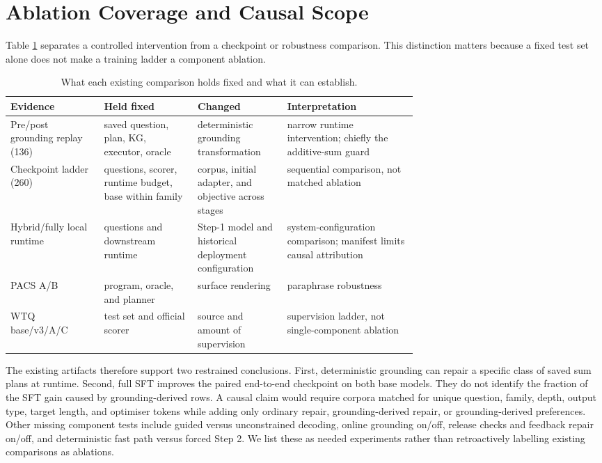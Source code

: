 \section{Ablation Coverage and Causal Scope}
\label{app:ablations}

Table \ref{tab:ablation-scope} separates a controlled intervention from a checkpoint or robustness
comparison.  This distinction matters because a fixed test set alone does not make a training
ladder a component ablation.

\begin{table}[h]
  \centering
  \caption{What each existing comparison holds fixed and what it can establish.}
  \label{tab:ablation-scope}
  \small
  \begin{tabularx}{\linewidth}{p{0.23\linewidth}p{0.23\linewidth}p{0.22\linewidth}X}
    \toprule
    Evidence & Held fixed & Changed & Interpretation \\
    \midrule
    Pre/post grounding replay (136) & saved question, plan, KG, executor, oracle & deterministic grounding transformation & narrow runtime intervention; chiefly the additive-sum guard \\
    Checkpoint ladder (260) & questions, scorer, runtime budget, base within family & corpus, initial adapter, and objective across stages & sequential comparison, not matched ablation \\
    Hybrid/fully local runtime & questions and downstream runtime & Step-1 model and historical deployment configuration & system-configuration comparison; manifest limits causal attribution \\
    PACS A/B & program, oracle, and planner & surface rendering & paraphrase robustness \\
    WTQ base/v3/A/C & test set and official scorer & source and amount of supervision & supervision ladder, not single-component ablation \\
    \bottomrule
  \end{tabularx}
\end{table}

The existing artifacts therefore support two restrained conclusions.  First, deterministic
grounding can repair a specific class of saved sum plans at runtime.  Second, full SFT improves the
paired end-to-end checkpoint on both base models.  They do not identify the fraction of the SFT
gain caused by grounding-derived rows.  A causal claim would require corpora matched for unique
question, family, depth, output type, target length, and optimiser tokens while adding only ordinary
repair, grounding-derived repair, or grounding-derived preferences.  Other missing component
tests include guided versus unconstrained decoding, online grounding on/off, release checks and
feedback repair on/off, and deterministic fast path versus forced Step 2.  We list these as needed
experiments rather than retroactively labelling existing comparisons as ablations.

